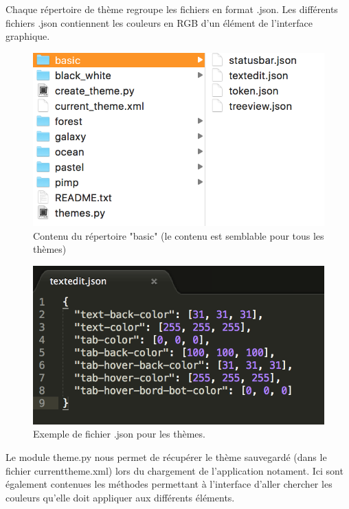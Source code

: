 \documentclass[a4paper,12pt]{article}
\begin{document}
			Chaque répertoire de thème regroupe les fichiers en format .json. Les différents fichiers .json contiennent les couleurs en RGB d'un élément de l'interface graphique.
			
			\begin{figure}[h!]
				\begin{center}
					\includegraphics[scale=0.7]{imgs/basic_json}
					\caption{Contenu du répertoire "basic" (le contenu est semblable pour tous les thèmes)}
				\end{center}
			\end{figure}
			\begin{figure}[h!]
				\begin{center}
					\includegraphics[scale=0.7]{imgs/exemple_json}
					\caption{Exemple de fichier .json pour les thèmes.}
				\end{center}
			\end{figure}
			
			Le module theme.py nous permet de récupérer le thème sauvegardé (dans le fichier currenttheme.xml) lors du chargement de l'application notament. Ici sont également contenues les méthodes permettant à l'interface d'aller chercher les couleurs qu'elle doit appliquer aux différents éléments.\\
			
\end{document}

